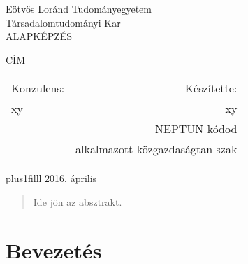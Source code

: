 \documentclass[12pt,a4paper]{report}
\begin{document}
\thispagestyle{empty}

\begin{center}
\LARGE
Eötvös Loránd Tudományegyetem \\
Társadalomtudományi Kar \\
ALAPKÉPZÉS

\vspace{60mm}

\Huge{CÍM}
\LARGE
\vspace{60mm}


\begin{tabular*}{\linewidth}{@{\extracolsep{\fill}}lr}
  Konzulens: & Készítette: \\
  xy & xy \\
   & NEPTUN kódod \\
   & alkalmazott közgazdaságtan szak
\end{tabular*}


\vskip0pt plus1filll
2016. április
\end{center}

\newpage
\setcounter{page}{1} 

\begin{abstract}

Ide jön az absztrakt.

\end{abstract}

\tableofcontents
\listoftables
\listoffigures
{}


\chapter{Bevezetés} \label{ch:bev}
\setcounter{page}{1} 
\end{document}

